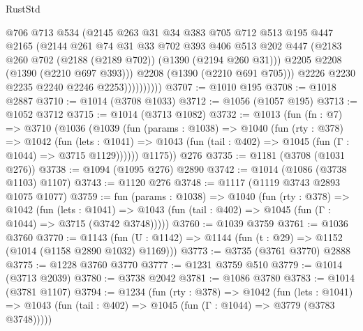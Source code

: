 \begin{lexlean}{RustStd}
\begin{coremodule}
                        @706
                        @713
                        @534
                        (@2145
                          @263
                          @31
                          @34
                          @383
                          @705
                          @712
                          @513
                          @195
                          @447
                          @2165
                          (@2144
                            @261
                            @74
                            @31
                            @33
                            @702
                            @393
                            @406
                            @513
                            @202
                            @447
                            (@2183 @260 @702 (@2188 (@2189 @702)) (@1390 (@2194 @260 @31)))
                            @2205
                            @2208
                            (@1390 (@2210 @697 @393)))
                          @2208
                          (@1390 (@2210 @691 @705)))
                        @2226
                        @2230
                        @2235
                        @2240
                        @2246
                        @2253))))))))))
@3707 := @1010 @195
@3708 := @1018 @2887
@3710 := @1014 (@3708 @1033)
@3712 := @1056 (@1057 @195)
@3713 := @1052 @3712
@3715 := @1014 (@3713 @1082)
@3732 := @1013
    (fun (fn : @7) =>
    @3710
      (@1036
        (@1039
          (fun (params : @1038) =>
          @1040
            (fun (rty : @378) =>
            @1042
              (fun (lets : @1041) =>
              @1043 (fun (tail : @402) => @1045 (fun (Γ : @1044) => @3715 @1129))))))
        @1175))
    @276
@3735 := @1181 (@3708 (@1031 @276))
@3738 := @1094 (@1095 @276) @2890
@3742 := @1014 (@1086 (@3738 @1103) @1107)
@3743 := @1120 @276
@3748 := @1117 (@1119 @3743 @2893 @1075 @1077)
@3759 := fun (params : @1038) =>
  @1040
    (fun (rty : @378) =>
    @1042
      (fun (lets : @1041) =>
      @1043 (fun (tail : @402) => @1045 (fun (Γ : @1044) => @3715 (@3742 @3748)))))
@3760 := @1039 @3759
@3761 := @1036 @3760
@3770 := @1143 (fun (U : @1142) => @1144 (fun (t : @29) => @1152 (@1014 (@1158 @2890 @1032) @1169)))
@3773 := @3735 (@3761 @3770) @2888
@3775 := @1228 @3760 @3770
@3777 := @1231 @3759 @510
@3779 := @1014 (@3713 @2039)
@3780 := @3738 @2042
@3781 := @1086 @3780
@3783 := @1014 (@3781 @1107)
@3794 := @1234
    (fun (rty : @378) =>
    @1042
      (fun (lets : @1041) =>
      @1043 (fun (tail : @402) => @1045 (fun (Γ : @1044) => @3779 (@3783 @3748)))))

\end{coremodule}
\end{lexlean}
